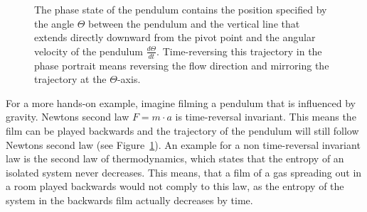 \begin{figure}[ht]
    \centering
    \begin{minipage}{0.34\textwidth}
        \centering
        \def\svgwidth{\textwidth}
        
        \def\svgwidth{\textwidth}
        
    \end{minipage}
    \begin{minipage}{0.2\textwidth}
        \centering
        \def\svgwidth{\textwidth}
        {\Huge }
    \end{minipage}
    \begin{minipage}{0.34\textwidth}
        \centering
        \def\svgwidth{\textwidth}
        
        \def\svgwidth{\textwidth}
        
    \end{minipage}
    \caption{The phase state of the pendulum contains the position specified by the angle \(\Theta \) between the pendulum and the vertical line that extends directly downward from the pivot point and the angular velocity of the pendulum \(\frac{d\Theta}{dt}\). Time-reversing this trajectory in the phase portrait means reversing the flow direction and mirroring the trajectory at the \(\Theta \)-axis.}\label{fig:phase_plot}
\end{figure}

For a more hands-on example, imagine filming a pendulum that is influenced by gravity.
Newtons second law \({F}=m \cdot {a}\) is time-reversal invariant. 
This means the film can be played backwards and the trajectory of the pendulum will still follow Newtons second law (see Figure~\ref{fig:phase_plot}).
An example for a non time-reversal invariant law is the second law of thermodynamics, which states that the entropy of an isolated system never decreases.
This means, that a film of a gas spreading out in a room played backwards would not comply to this law, as the entropy of the system in the backwards film actually decreases by time.


